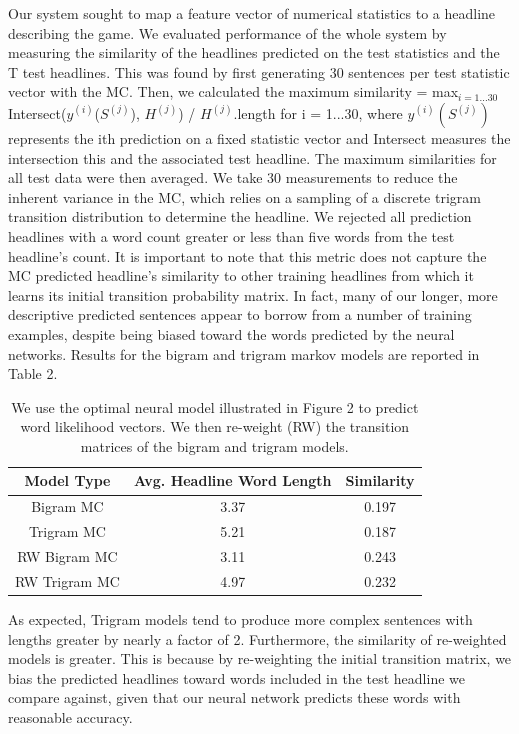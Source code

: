 \documentclass[12pt, journal]{IEEEtran}
\begin{document}
Our system sought to map a feature vector of numerical statistics to a headline describing the game. We evaluated performance of the whole system by measuring the similarity of the headlines predicted on the test statistics and the T test headlines. This was found by first generating 30 sentences per test statistic vector with the MC. Then, we calculated the maximum similarity = max$_{i=1...30}$ Intersect($y^{(i)}$($S^{(j)}$), $H^{(j)}$) / $H^{(j)}$.length for i = 1...30, where $y^{(i)}(S^{(j)})$ represents the ith prediction on a fixed statistic vector and Intersect measures the intersection this and the associated test headline. The maximum similarities for all test data were then averaged. We take 30 measurements to reduce the inherent variance in the MC, which relies on a sampling of a discrete trigram transition distribution to determine the headline. We rejected all prediction headlines with a word count greater or less than five words from the test headline's count. It is important to note that this metric does not capture the MC predicted headline's similarity to other training headlines from which it learns its initial transition probability matrix. In fact, many of our longer, more descriptive predicted sentences appear to borrow from a number of training examples, despite being biased toward the words predicted by the neural networks. Results for the bigram and trigram markov models are reported in Table 2. 

\begin{table}[!t]
\renewcommand{\arraystretch}{1.3}
\caption{We use the optimal neural model illustrated in Figure 2 to predict word likelihood vectors. We then re-weight (RW) the transition matrices of the bigram and trigram models.}
\label{table_example}
\centering
\begin{tabular}{|c||c||c|}
\hline
Model Type & Avg. Headline Word Length & Similarity \\
\hline
Bigram MC & 3.37 & 0.197\\
Trigram MC & 5.21 & 0.187\\
RW Bigram MC & 3.11 & 0.243\\
RW Trigram MC & 4.97 &  0.232\\

\hline
\end{tabular}
\end{table}

As expected, Trigram models tend to produce more complex sentences with lengths greater by nearly a factor of 2. Furthermore, the similarity of re-weighted models is greater. This is because by re-weighting the initial transition matrix, we bias the predicted headlines toward words included in the test headline we compare against, given that our neural network predicts these words with reasonable accuracy.
\end{document}
